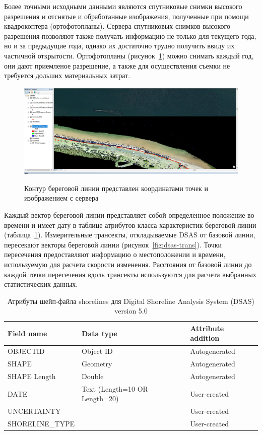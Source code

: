 \documentclass[732,fontsize=14pt,final]{studrep}
\begin{document}
Более точными исходными данными являются спутниковые снимки высокого разрешения и отснятые и обработанные изображения, полученные при помощи квадрокоптера (ортофотопланы). Сервера спутниковых снимков высокого разрешения позволяют также получать информацию не только для текущего года, но и за предыдущие года, однако их достаточно трудно получить ввиду их частичной открытости. Ортофотопланы (рисунок~\ref{fig:ortho-src}) можно снимать каждый год, они дают приемленое разрешение, а также для осуществления съемки не требуется дольших материальных затрат.

\begin{figure}[htp]
  \centering
  \includegraphics[width=\linewidth]{pics/image12.png}\label{fig:ortho-src}
  \caption{Контур береговой линии представлен координатами точек и изображением с сервера}
\end{figure}

Каждый вектор береговой линии представляет собой определенное положение во времени и имеет дату в таблице атрибутов класса характеристик береговой линии (таблица~\ref{tbl:struct}). Измерительные трансекты, откладываемые DSAS от базовой линии, пересекают векторы береговой линии (рисунок~\ref{fig:dsas-trans}). Точки пересечения предоставляют информацию о местоположении и времени, используемую для расчета скорости изменения. Расстояния от базовой линии до каждой точки пересечения вдоль трансекты используются для расчета выбранных статистических данных.

\begin{table}
  \caption{Атрибуты шейп-файла shorelines для Digital Shoreline Analysis System (DSAS) version 5.0}\label{tbl:struct}
  \centering
  \begin{tabular}{|l|l|l|}
    \hline 
    Field name &	Data type &	Attribute addition\\\hline 
    OBJECTID	& Object ID	& Autogenerated\\
    SHAPE & 	Geometry	& Autogenerated\\
    SHAPE Length	& Double	& Autogenerated\\
    DATE	& Text (Length=10 OR Length=20)& User-created	\\
    UNCERTAINTY	& &	User-created	\\
    SHORELINE\_TYPE	& &	User-created\\
    \hline
  \end{tabular}
\end{table}
\end{document}
